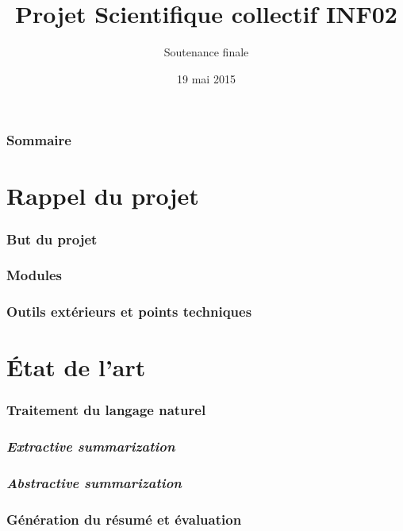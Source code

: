 \documentclass[12pt]{beamer}
\title{Projet Scientifique collectif INF02}
\subtitle{Soutenance finale}
\author{}
\date{19 mai 2015}
\begin{document}
    \begin{frame}
      \titlepage
    \end{frame}		

    \begin{frame}
      \frametitle{Sommaire}
      \tableofcontents
    \end{frame}

\section{Rappel du projet}


\begin{frame}
 \frametitle{But du projet}
 
 
\end{frame}


\begin{frame}
 \frametitle{Modules}
 
 
\end{frame}


\begin{frame}
 \frametitle{Outils extérieurs et points techniques}
 
 
\end{frame}

\section{État de l'art}

\begin{frame}
 \frametitle{Traitement du langage naturel}
 
 
\end{frame}

\begin{frame}
 \frametitle{\textit{Extractive summarization}}
 
 
\end{frame}

\begin{frame}
 \frametitle{\textit{Abstractive summarization}}
 
 
\end{frame}


\begin{frame}
 \frametitle{Génération du résumé et évaluation}
 
 
\end{frame}
\end{document}
